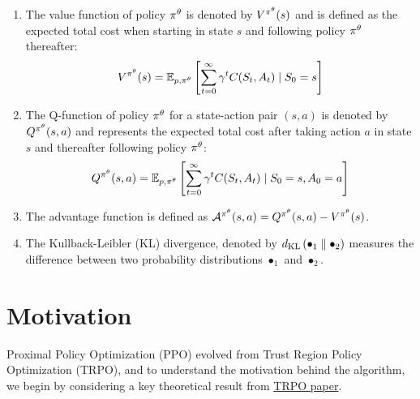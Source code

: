 \documentclass[12pt,twoside]{../../mitthesis}
\begin{document}
\begin{enumerate}
    \item The value function of policy $\policy^{\theta}$ is denoted by $V^{\policy^{\theta}}(s)$ and is defined as the expected total cost when starting in state $s$ and following policy $\policy^{\theta}$ thereafter:
    $$
    \Value^{\policy^{\theta}}(s) =  \E[\transit, \policy^{\theta}]{\sum_{t = 0}^{\infty} \gamma ^ t \Cost(\State_{t}, \Action_{t}) \mid \State_0 = \state}
    $$ 
    \item The Q-function of policy $\policy^{\theta}$ for a state-action pair $(s, a)$ is denoted by $Q^{\policy^{\theta}}(s, a)$ and represents the expected total cost after taking action $a$ in state $s$ and thereafter following policy $\policy^{\theta}$: 
    $$
    Q^{\policy^{\theta}}(s, a) = \E[\transit, \policy^{\theta}]{\sum_{t = 0}^{\infty} \gamma ^ t \Cost(\State_{t}, \Action_{t}) \mid \State_0 = \state, \Action_0 = \action}
    $$
    \item The advantage function is defined as $\Advan^{\policy^{\theta}}(s, a) = Q^{\policy^{\theta}}(s, a) - \Value^{\policy^{\theta}}(s)$.
    \item The Kullback-Leibler (KL) divergence, denoted by $\kldiv{\bullet_1}{\bullet_2}$ measures the difference between two probability distributions $\bullet_1$ and $\bullet_2$.
\end{enumerate}


\section*{Motivation}

Proximal Policy Optimization (PPO) evolved from Trust Region Policy Optimization (TRPO), and to understand the motivation behind the algorithm, we begin by considering a key theoretical result from \href{https://arxiv.org/abs/1502.05477}{TRPO paper}.
\end{document}
